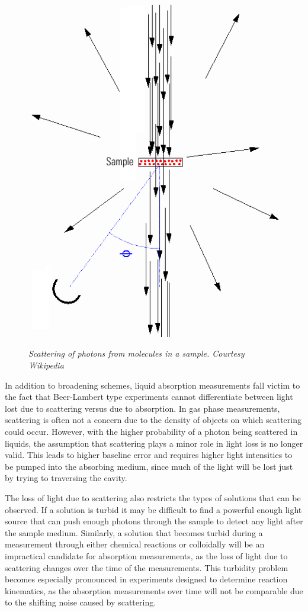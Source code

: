 \begin{figure}
\begin{center}
  \includegraphics[width=\marginspace]{figures/scatter.png}
\end{center}
\emph{\footnotesize{Scattering of photons from molecules in a sample. Courtesy Wikipedia}}
\end{figure}

In addition to broadening schemes, liquid absorption measurements fall victim
to the fact that Beer-Lambert type experiments cannot differentiate between
light lost due to scattering versus due to absorption.  In gas phase
measurements, scattering is often not a concern due to the density of objects
on which scattering could occur. However, with the higher probability of a
photon being scattered in liquids, the assumption that scattering plays a minor
role in light loss is no longer valid. This leads to higher baseline error and
requires higher light intensities to be pumped into the absorbing medium, since
much of the  light will be lost just by trying to traversing the cavity.

The loss of light due to scattering also restricts the types of solutions that
can be observed. If a solution is turbid it may be difficult to find a powerful
enough light source that can push enough photons through the sample to detect
any light after the sample medium. Similarly, a solution that becomes turbid
during a measurement through either chemical reactions or colloidally will be
an impractical candidate for absorption measurements, as the loss of light due
to scattering changes over the time of the measurements. This turbidity problem
becomes especially pronounced in experiments designed to determine reaction
kinematics, as the absorption measurements over time will not be comparable due
to the shifting noise caused by scattering.

